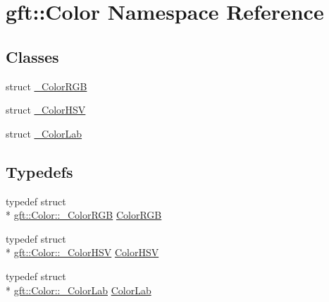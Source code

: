 \hypertarget{namespacegft_1_1Color}{\section{gft\-:\-:Color Namespace Reference}
\label{namespacegft_1_1Color}
}
\subsection*{Classes}
\begin{DoxyCompactItemize}
\item 
struct \hyperlink{structgft_1_1Color_1_1__ColorRGB}{\-\_\-\-Color\-R\-G\-B}
\item 
struct \hyperlink{structgft_1_1Color_1_1__ColorHSV}{\-\_\-\-Color\-H\-S\-V}
\item 
struct \hyperlink{structgft_1_1Color_1_1__ColorLab}{\-\_\-\-Color\-Lab}
\end{DoxyCompactItemize}
\subsection*{Typedefs}
\begin{DoxyCompactItemize}
\item 
typedef struct \\*
\hyperlink{structgft_1_1Color_1_1__ColorRGB}{gft\-::\-Color\-::\-\_\-\-Color\-R\-G\-B} \hyperlink{namespacegft_1_1Color_ac5d6eeb0a5908559d77e2a007419b5f0}{Color\-R\-G\-B}
\item 
typedef struct \\*
\hyperlink{structgft_1_1Color_1_1__ColorHSV}{gft\-::\-Color\-::\-\_\-\-Color\-H\-S\-V} \hyperlink{namespacegft_1_1Color_aed1455cdf0cb4b82a52036558c79c7ec}{Color\-H\-S\-V}
\item 
typedef struct \\*
\hyperlink{structgft_1_1Color_1_1__ColorLab}{gft\-::\-Color\-::\-\_\-\-Color\-Lab} \hyperlink{namespacegft_1_1Color_ad20d597f5459319babaaef54b8a2090d}{Color\-Lab}
\end{DoxyCompactItemize}

